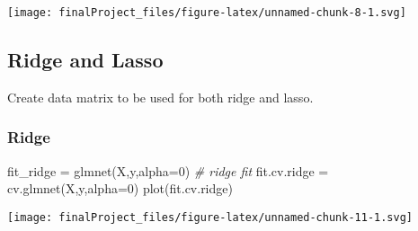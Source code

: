 \documentclass[
]{article}
\newenvironment{Shaded}{\begin{snugshade}}{\end{snugshade}}
\newcommand{\AttributeTok}[1]{\textcolor[rgb]{0.77,0.63,0.00}{#1}}
\newcommand{\CommentTok}[1]{\textcolor[rgb]{0.56,0.35,0.01}{\textit{#1}}}
\newcommand{\DecValTok}[1]{\textcolor[rgb]{0.00,0.00,0.81}{#1}}
\newcommand{\FunctionTok}[1]{\textcolor[rgb]{0.00,0.00,0.00}{#1}}
\newcommand{\NormalTok}[1]{#1}
\newcommand{\OtherTok}[1]{\textcolor[rgb]{0.56,0.35,0.01}{#1}}
\newcommand{\SpecialCharTok}[1]{\textcolor[rgb]{0.00,0.00,0.00}{#1}}
\begin{document}
\texttt{[image: finalProject\_files/figure-latex/unnamed-chunk-8-1.svg]}

\hypertarget{ridge-and-lasso}{%
\subsection{Ridge and Lasso}\label{ridge-and-lasso}}

Create data matrix to be used for both ridge and lasso.

\begin{Shaded}
\end{Shaded}

\hypertarget{ridge}{%
\subsubsection{Ridge}\label{ridge}}

\begin{Shaded}
\begin{Highlighting}[]
\NormalTok{fit\_ridge }\OtherTok{=} \FunctionTok{glmnet}\NormalTok{(X,y,}\AttributeTok{alpha=}\DecValTok{0}\NormalTok{) }\CommentTok{\# ridge fit}
\NormalTok{fit.cv.ridge }\OtherTok{=} \FunctionTok{cv.glmnet}\NormalTok{(X,y,}\AttributeTok{alpha=}\DecValTok{0}\NormalTok{)}
\FunctionTok{plot}\NormalTok{(fit.cv.ridge)}
\end{Highlighting}
\end{Shaded}

\texttt{[image: finalProject\_files/figure-latex/unnamed-chunk-11-1.svg]}
\end{document}
